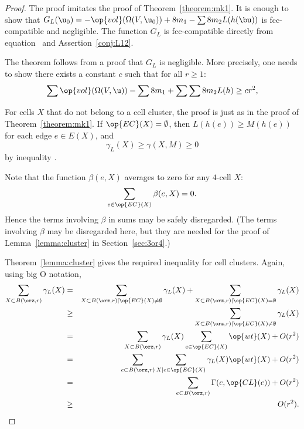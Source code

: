 \begin{proof} The proof imitates the proof of
Theorem~\ref{theorem:mk1}.  It is enough to show that $G_L( \u_0) =
-\op{vol}(\Omega(V, \u_0)) + 8 m_1 - \sum 8 m_2 L(h(\bu))$ is
fcc-compatible and negligible.  The function $G_L$ is fcc-compatible
directly from equation~ and Assertion~\ref{conj:L12}.

The theorem follows from a proof that $G_L$ is negligible.  More
precisely, one needs to show there exists a constant $c$ such that
for all $r\ge 1$:%
\begin{equation}\label{eqn:A2neg} 
\sum \op{vol}(\Omega(V, \u)) -\sum 8m_1 + \sum \sum 8 m_2 L(h) \ge c r^2,
\end{equation}

For cells $X$ that do not belong to a cell cluster,
the proof is just as in the proof of Theorem~\ref{theorem:mk1}.
If $\op{EC}(X)=\emptyset$, then 
$L(h(e))\ge M(h(e))$ for each edge $e\in E(X)$, and
\begin{displaymath}\gamma_L(X)\ge \gamma(X,M)\ge 0\end{displaymath} 
by inequality .

Note that the function $\beta(e,X)$ averages to zero for any $4$-cell $X$:
\begin{displaymath} 
\sum_{e\in \op{EC}(X)} \beta(e,X) = 0.
\end{displaymath}
Hence the terms involving $\beta$ in sums may be safely disregarded.
(The terms involving $\beta$ may be disregarded here, but they are
needed for the proof of Lemma~\ref{lemma:cluster} in
Section~\ref{sec:3or4}.)

Theorem~\ref{lemma:cluster} gives the required inequality for cell
clusters.  Again, using big O notation,
\begin{eqnarray*} 
\sum_{X\subset B(\orz,r)} \gamma_L(X) &=&
\sum_{X\subset B(\orz,r)\mid \op{EC}(X)\ne\emptyset} \gamma_L(X) +
\sum_{X\subset B(\orz,r)\mid \op{EC}(X)=\emptyset} \gamma_L(X) \vspace{6pt}\\
&\ge& \sum_{X\subset B(\orz,r)\mid \op{EC}(X)\ne\emptyset} \gamma_L(X)\vspace{6pt} \\
&=&\sum_{X\subset B(\orz,r)}\gamma_L(X)\sum_{e \in \op{EC}(X)}\op{wt}(X) + O(r^2)\vspace{6pt}\\
&=&\sum_{e\subset B(\orz,r)}\sum_{X\mid e \in \op{EC}(X)}\gamma_L(X)\op{wt}(X) + O(r^2)\vspace{6pt}\\
&=&\sum_{e\subset B(\orz,r)}\Gamma(e,\op{CL}(e)) + O(r^2)\vspace{6pt}\\
&\ge& ~~O(r^2).
\end{eqnarray*}



\end{proof}
